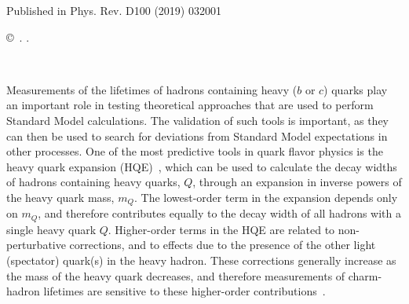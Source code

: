 \documentclass[12pt,a4paper]{article}
\def\paperlicenceurl{https://creativecommons.org/licenses/by/4.0/}
\begin{document}
\begin{titlepage}
\begin{abstract}
\end{abstract}

\vspace*{2.0cm}

\begin{center}
  Published in Phys. Rev. D100 (2019) 032001
\end{center}

\vspace{\fill}

{\footnotesize 
\centerline{\copyright~\papercopyright. \href{\paperlicenceurl}{\paperlicence}.}}
\vspace*{2mm}

\end{titlepage}




\newpage
\setcounter{page}{2}
\mbox{~}

\cleardoublepage







 

\renewcommand{\thefootnote}{\arabic{footnote}}
\setcounter{footnote}{0}






\pagestyle{plain} \setcounter{page}{1}





Measurements of the lifetimes of hadrons containing heavy ($b$ or $c$) quarks play an important role in testing theoretical approaches
that are used to perform Standard Model calculations. The validation of such tools is important, as they
can then be used to search for deviations from Standard Model expectations in other processes. One of the most predictive tools in quark flavor physics
is the heavy quark expansion (HQE)~\cite{Khoze:1983yp,Bigi:1991ir,Bigi:1992su,Blok:1992hw,*Blok:1992he,Neubert:1997gu,Uraltsev:1998bk,Bigi:1995jr}, which
can be used to calculate the decay widths of hadrons containing heavy quarks, $Q$, through an expansion in inverse powers of 
the heavy quark mass, $m_Q$. The lowest-order term in the expansion depends only on $m_Q$, and therefore contributes equally to the
decay width of all hadrons with a single heavy quark $Q$.
Higher-order terms in the HQE are related to non-perturbative corrections, and to effects due to the 
presence of the other light (spectator) quark(s) in the heavy hadron. These corrections generally increase as the mass of the heavy quark decreases, and
therefore measurements of charm-hadron lifetimes are sensitive to these higher-order 
contributions~\cite{Kirk:2017juj,Cheng:2015iom,Lenz:2013aua,Bianco:2003vb,Bellini:1996ra,Blok:1991st}.
\end{document}
